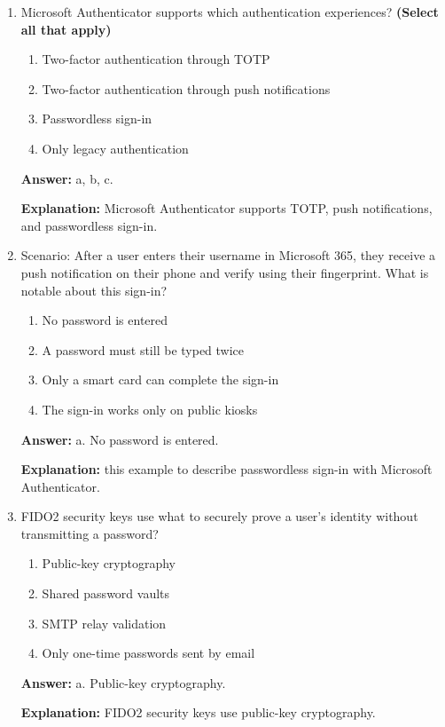 \documentclass[10pt]{article}
\begin{document}
\begin{enumerate}[leftmargin=*]
\item Microsoft Authenticator supports which authentication experiences? \textbf{(Select all that apply)}
\begin{enumerate}[label=\alph*., leftmargin=1.5em]
\item Two-factor authentication through TOTP
\item Two-factor authentication through push notifications
\item Passwordless sign-in
\item Only legacy authentication
\end{enumerate}
\textbf{Answer:} a, b, c.

\textbf{Explanation:} Microsoft Authenticator supports TOTP, push notifications, and passwordless sign-in.

\item Scenario: After a user enters their username in Microsoft 365, they receive a push notification on their phone and verify using their fingerprint. What is notable about this sign-in?
\begin{enumerate}[label=\alph*., leftmargin=1.5em]
\item No password is entered
\item A password must still be typed twice
\item Only a smart card can complete the sign-in
\item The sign-in works only on public kiosks
\end{enumerate}
\textbf{Answer:} a. No password is entered.

\textbf{Explanation:} this example to describe passwordless sign-in with Microsoft Authenticator.

\item FIDO2 security keys use what to securely prove a user's identity without transmitting a password?
\begin{enumerate}[label=\alph*., leftmargin=1.5em]
\item Public-key cryptography
\item Shared password vaults
\item SMTP relay validation
\item Only one-time passwords sent by email
\end{enumerate}
\textbf{Answer:} a. Public-key cryptography.

\textbf{Explanation:} FIDO2 security keys use public-key cryptography.


\end{enumerate}
\end{document}
